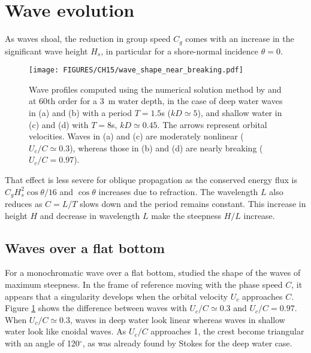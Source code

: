 \section{Wave evolution}
As waves shoal, the reduction in group speed $C_g$ comes with an increase in the significant wave height $H_s$, in particular 
for a shore-normal incidence $\theta=0$. 
\begin{figure}[htb]
 \vspace{9pt}
\centerline{\texttt{[image: FIGURES/CH15/wave\_shape\_near\_breaking.pdf]}}
 \caption{Wave profiles computed using the numerical solution method by\cite{Dean1965} and \cite{Dalrymple1974} 
 at 60th order for a 3~m water depth, in the case of deep water waves in (a) and (b) with a period $T=1.5$s ($kD \simeq 5$), and 
 shallow water in  (c) and (d)  with $T=8$s, $kD \simeq 0.45$. The arrows represent orbital velocities. 
 Waves in (a) and (c) are moderately nonlinear ($U_c/C \simeq 0.3$), whereas those in (b) and (d) are nearly 
 breaking ($U_c/C = 0.97$). 
 }
 \label{fig:WAVES}
\end{figure}
That effect is less severe for oblique propagation as the conserved energy flux is  $C_g H_s^2 \cos \theta
/16$  and $\cos \theta$ increases due to refraction. The wavelength $L$ also reduces as $C=L/T$ slows down and the period remains constant. 
This increase in height $H$ and decrease in wavelength $L$ make the steepness $H/L$ increase. 

\subsection{Waves over a flat bottom}
For a monochromatic wave over a flat bottom, \cite{Miche1944d} studied the shape of the waves of maximum steepness. 
In the frame of reference moving with the phase speed $C$, 
it appears that a singularity develops when the orbital velocity $U_c$ approaches $C$. Figure \ref{fig:WAVES} shows 
the difference between waves with $U_c/C \simeq 0.3$ and $U_c/C = 0.97$. When $U_c/C \simeq 0.3$, waves in deep water look linear 
whereas waves in shallow water look like cnoidal waves. As $U_c/C$ approaches 1, the crest become triangular 
with an angle of 120$^\circ$, as was already found by Stokes for the deep water case.

